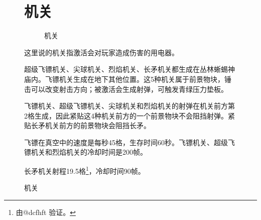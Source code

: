 \begin{figure}[!ht]
\section{机关}
\begin{figure}[!ht]
\centering
{}\qquad
{}\qquad
{}\qquad
{}\qquad
{}\qquad
{}\qquad
{}\qquad
{}
\caption{机关}
\end{figure}
这里说的机关指激活会对玩家造成伤害的用电器。

超级飞镖机关、尖球机关、烈焰机关、长矛机关都生成在丛林蜥蜴神庙内。飞镖机关生成在地下其他位置。这5种机关属于前景物块，锤击可以改变射击方向；被激活会生成射弹，可触发青绿压力垫板。

飞镖机关、超级飞镖机关、尖球机关和烈焰机关的射弹在机关前方第2格生成，因此紧贴这4种机关前方的一个前景物块不会阻挡射弹。紧贴长矛机关前方的前景物块会阻挡长矛。

飞镖在真空中的速度是每秒45格，生存时间60秒。飞镖机关、超级飞镖机关和烈焰机关的冷却时间是200帧。

长矛机关射程19.5格\footnote{由@dcfhft 验证。}，冷却时间90帧。


\end{figure}
